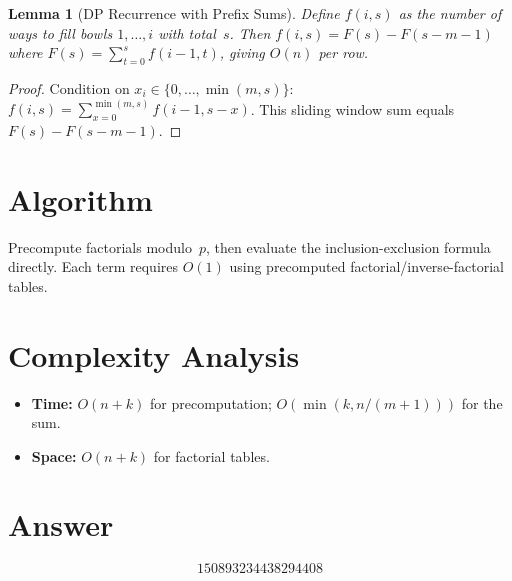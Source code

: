 \documentclass[11pt]{article}
\newtheorem{lemma}[theorem]{Lemma}
\begin{document}
\begin{lemma}[DP Recurrence with Prefix Sums]
Define $f(i,s)$ as the number of ways to fill bowls $1,\ldots,i$ with total~$s$. Then $f(i,s)=F(s)-F(s-m-1)$ where $F(s)=\sum_{t=0}^{s}f(i-1,t)$, giving $O(n)$ per row.
\end{lemma}

\begin{proof}
Condition on $x_i\in\{0,\ldots,\min(m,s)\}$: $f(i,s)=\sum_{x=0}^{\min(m,s)}f(i-1,s-x)$. This sliding window sum equals $F(s)-F(s-m-1)$.
\end{proof}

\section{Algorithm}

Precompute factorials modulo~$p$, then evaluate the inclusion-exclusion formula directly. Each term requires $O(1)$ using precomputed factorial/inverse-factorial tables.

\section{Complexity Analysis}

\begin{itemize}
\item \textbf{Time:} $O(n+k)$ for precomputation; $O(\min(k,n/(m+1)))$ for the sum.
\item \textbf{Space:} $O(n+k)$ for factorial tables.
\end{itemize}

\section{Answer}

\[
\boxed{150893234438294408}
\]
\end{document}
